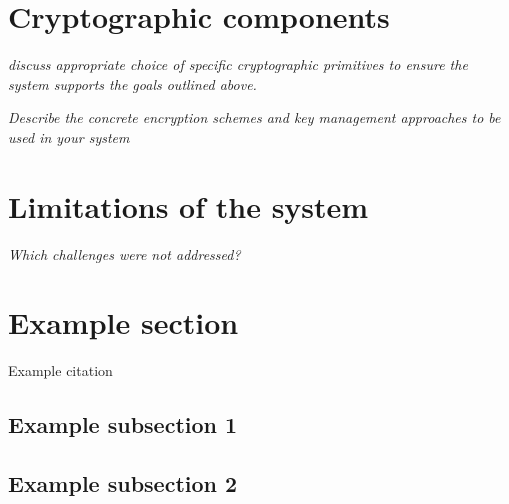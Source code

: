 \documentclass[11pt]{article}
\begin{document}
\begin{flushleft}
		\section{Cryptographic components}

		\textit{discuss appropriate choice of specific cryptographic primitives to ensure the system supports the goals outlined above.}

		\textit{Describe the concrete encryption schemes and key management approaches to be used in your system}

		\section{Limitations of the system}

		\textit{Which challenges were not addressed?}
		
		\section{Example section}
		
		Example citation \cite{neuman2009challenges}
		
		\subsection{Example subsection 1}
		
		\subsection{Example subsection 2}
		
		\newpage
		
		
		
		
		
		
	\end{flushleft}
	
\end{document}
